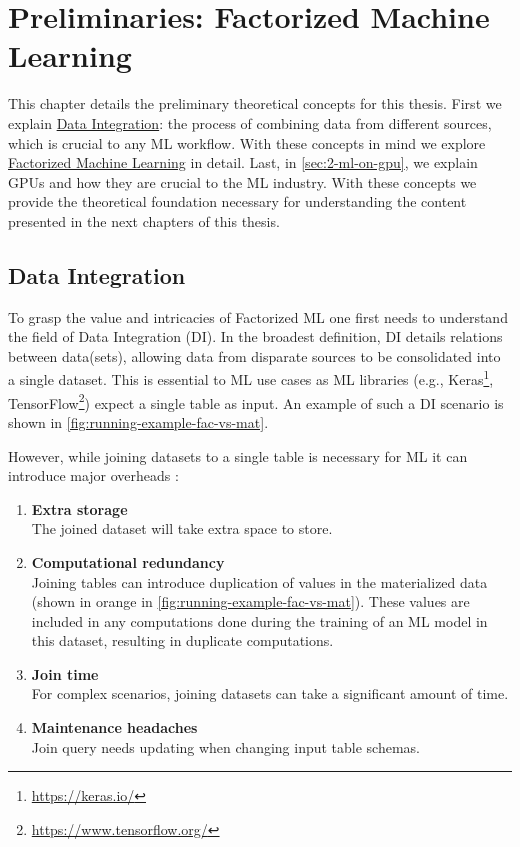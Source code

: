 
\chapter{Preliminaries: Factorized Machine Learning}
\label{chapter:preliminary}

This chapter details the preliminary theoretical concepts for this thesis. First we explain \hyperref[sec:2-data-integration]{Data Integration}: the process of combining data from different sources, which is crucial to any ML workflow. With these concepts in mind we explore \hyperref[sec:2-factorized-ml]{Factorized Machine Learning} in detail. Last, in \autoref{sec:2-ml-on-gpu}, we explain GPUs and how they are crucial to the ML industry. With these concepts we provide the theoretical foundation necessary for understanding the content presented in the next chapters of this thesis.


\section{Data Integration}
\label{sec:2-data-integration}
To grasp the value and intricacies of Factorized ML one first needs to understand the field of Data Integration (DI). In the broadest definition, DI details relations between data(sets), allowing data from disparate sources to be consolidated into a single dataset. This is essential to ML use cases as ML libraries (e.g., Keras\footnote{\url{https://keras.io/}}, TensorFlow\footnote{\url{https://www.tensorflow.org/}}) expect a single table as input. An example of such a DI scenario is shown in \autoref{fig:running-example-fac-vs-mat}.


However, while joining datasets to a single table is necessary for ML it can introduce major overheads \cite{data-management-in-ML-kumar-2017}:

\begin{enumerate}
    \item \textbf{Extra storage}\\ The joined dataset will take extra space to store.
    \item \textbf{Computational redundancy} \\ Joining tables can introduce duplication of values in the materialized data (shown in orange in \autoref{fig:running-example-fac-vs-mat}). These values are included in any computations done during the training of an ML model in this dataset, resulting in duplicate computations.
    \item \textbf{Join time} \\For complex scenarios, joining datasets can take a significant amount of time.
    \item \textbf{Maintenance headaches} \\Join query needs updating when changing input table schemas.
\end{enumerate}

